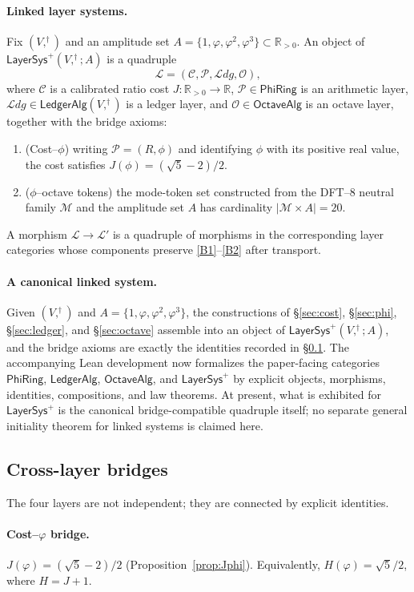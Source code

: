 \documentclass[11pt,reqno]{amsart}
\theoremstyle{plain}
\theoremstyle{definition}
\theoremstyle{remark}
\newcommand{\phig}{\varphi}
\newcommand{\Jcost}{J}
\newcommand{\RR}{\mathbb{R}}
\newcommand{\1}{\mathbf{1}}
\newcommand{\paperadd}[1]{{\color{paperblue}#1}}
\begin{document}
\paragraph{Linked layer systems.}
Fix $(V,^\dagger)$ and an amplitude set $A=\{1,\phig,\phig^2,\phig^3\}\subset \RR_{>0}$.  An object of $\mathsf{LayerSys}^{+}(V,^\dagger;A)$ is a quadruple
\[
\mathcal L=(\mathcal C,\mathcal P,\mathcal Ldg,\mathcal O),
\]
where $\mathcal C$ is a calibrated ratio cost $\Jcost:\RR_{>0}\to\RR$, $\mathcal P\in\mathsf{PhiRing}$ is an arithmetic layer, $\mathcal Ldg\in\mathsf{LedgerAlg}(V,^\dagger)$ is a ledger layer, and $\mathcal O\in\mathsf{OctaveAlg}$ is an octave layer, together with the bridge axioms:
\begin{enumerate}[label=(B\arabic*),nosep]
\item\label{B1} (Cost--$\phi$) writing $\mathcal P=(R,\phi)$ and identifying $\phi$ with its positive real value, the cost satisfies $\Jcost(\phi)=(\sqrt5-2)/2$.
\item\label{B2} ($\phi$--octave tokens) the mode-token set constructed from the DFT--$8$ neutral family $\mathcal M$ and the amplitude set $A$ has cardinality $|\mathcal M\times A|=20$.
\end{enumerate}
A morphism $\mathcal L\to\mathcal L'$ is a quadruple of morphisms in the corresponding layer categories whose components preserve \ref{B1}--\ref{B2} after transport.

\paragraph{A canonical linked system.}
Given $(V,^\dagger)$ and $A=\{1,\phig,\phig^2,\phig^3\}$, the constructions of \S\ref{sec:cost}, \S\ref{sec:phi}, \S\ref{sec:ledger}, and \S\ref{sec:octave} assemble into an object of $\mathsf{LayerSys}^{+}(V,^\dagger;A)$, and the bridge axioms are exactly the identities recorded in \S\ref{subsec:bridges}.
\paperadd{The accompanying Lean development now formalizes the paper-facing categories $\mathsf{PhiRing}$, $\mathsf{LedgerAlg}$, $\mathsf{OctaveAlg}$, and $\mathsf{LayerSys}^{+}$ by explicit objects, morphisms, identities, compositions, and law theorems. At present, what is exhibited for $\mathsf{LayerSys}^{+}$ is the canonical bridge-compatible quadruple itself; no separate general initiality theorem for linked systems is claimed here.}


\subsection{Cross-layer bridges}\label{subsec:bridges}
The four layers are not independent; they are connected by explicit
identities. \paragraph{Cost--$\phig$ bridge.}\label{prop:cost-phi} $\Jcost(\phig)=(\sqrt5-2)/2$ (Proposition~\ref{prop:Jphi}). Equivalently, $H(\phig)=\sqrt5/2$, where $H=\Jcost+1$.
\end{document}
